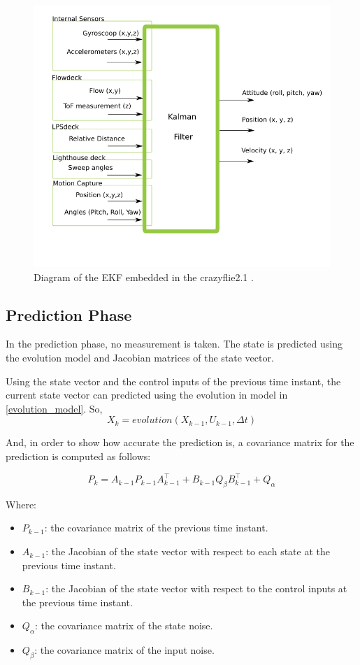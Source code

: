 \documentclass{thesisreport}
\begin{document}
\begin{figure}[h]
	\centering
	\includegraphics[width=.5\textwidth]{Images/ekf/extended_kalman_filter.png}
	\caption{Diagram of the EKF embedded in the crazyflie2.1 \cite{EKF_bitcraze}.}
	\label{ekf_diagram_crazyflie}
\end{figure}

	\subsection{Prediction Phase}
	In the prediction phase, no measurement is taken. The state is predicted using the evolution model and Jacobian matrices of the state vector.
	
Using the state vector and the control inputs of the previous time instant, the current state vector can predicted using the evolution in model in \ref{evolution_model}. So,
    \begin{equation}
        X_k = evolution(X_{k-1}, U_{k-1},\Delta t)
    \end{equation}

And, in order to show how accurate the prediction is, a covariance matrix for the prediction is computed as follows:

    \begin{equation}
        P_k = A_{k-1} P_{k-1} A_{k-1}^{\intercal} + B_{k-1} Q_{\beta} B_{k-1}^{\intercal} + Q_{\alpha}
    \end{equation}

Where: 

\begin{itemize}
	\item $P_{k-1}$: the covariance matrix of the previous time instant.
	\item $A_{k-1}$: the Jacobian of the state vector with respect to each state at the previous time instant.
	\item $B_{k-1}$: the Jacobian of the state vector with respect to the control inputs at the previous time instant.
	\item $Q_{\alpha}$: the covariance matrix of the state noise.
	\item $Q_{\beta}$: the covariance matrix of the input noise.
\end{itemize}	
\end{document}
